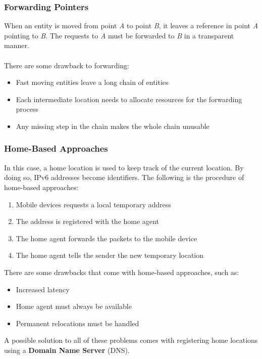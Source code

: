 \documentclass{article}
\begin{document}
\subsubsection{Forwarding Pointers}
When an entity is moved from point \textit{A} to point \textit{B}, it leaves a reference in point \textit{A} pointing to \textit{B}. The requests to \textit{A} must be forwarded to \textit{B} in a transparent manner. \\ \\
There are some drawback to forwarding:

\begin{itemize}
	\item Fast moving entities leave a long chain of entities
	\item Each intermediate location needs to allocate resources for the forwarding process
	\item Any missing step in the chain makes the whole chain unusable
\end{itemize}

\subsubsection{Home-Based Approaches}
In this case, a home location is used to keep track of the current location. By doing so, IPv6 addresses become identifiers. The following is the procedure of home-based approaches:

\begin{enumerate}
	\item Mobile devices requests a local temporary address
	\item The address is registered with the home agent
	\item The home agent forwards the packets to the mobile device
	\item The home agent tells the sender the new temporary location
\end{enumerate}

\noindent There are some drawbacks that come with home-based approaches, such as:

\begin{itemize}
	\item Increased latency
	\item Home agent must always be available
	\item Permanent relocations must be handled
\end{itemize}

\noindent A possible solution to all of these problems comes with registering home locations using a \textbf{Domain Name Server} (DNS).
\end{document}
